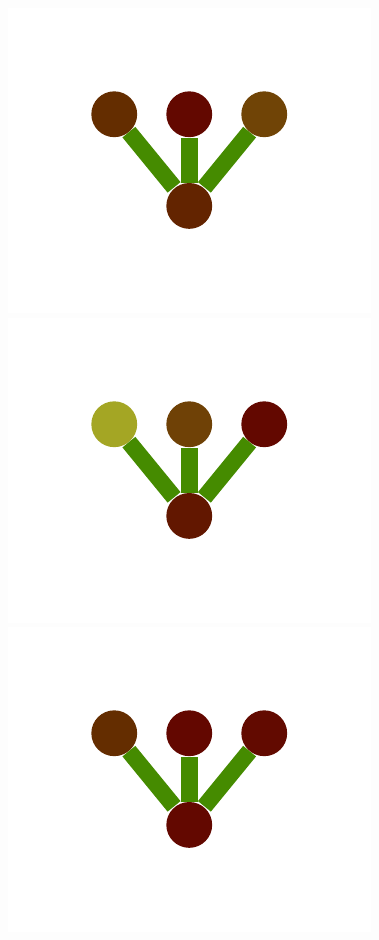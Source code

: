 \documentclass[a4paper,10pt]{article}
\begin{document}
\begin{figure}
{    \includegraphics[scale=.2]{./figures/6-1-single-color-flower-induced-3.pdf}
    \includegraphics[scale=.2]{./figures/6-1-single-color-flower-induced-4.pdf}
    \includegraphics[scale=.2]{./figures/6-1-single-color-flower-induced-5.pdf}
}
\end{figure}
\end{document}
